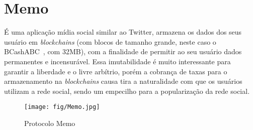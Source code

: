 








\section{Memo}

É uma aplicação mídia social similar ao Twitter, armazena os dados dos seus usuário em \textit{blockchains} (com blocos de tamanho grande, neste caso o BCashABC~\cite{BTCABC}, com 32MB), com a finalidade de permitir ao seu usuário dados permanentes e incensurável.
Essa imutabilidade é muito interessante para garantir a liberdade e o livre arbítrio, porém a cobrança de taxas para o armazenamento na \textit{blockchains} causa tira a naturalidade com que os usuários utilizam a rede social, sendo um empecilho para a popularização da rede social.
\begin{figure}[htb!]
\centering\texttt{[image: fig/Memo.jpg]}
\caption%
        {\label{fig:memo-protocol}Protocolo Memo~\cite{Memo1}}
\end{figure}

